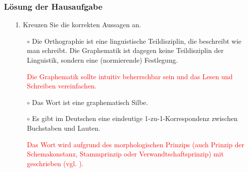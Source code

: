 
\begin{frame}%
\frametitle{Lösung der Hausaufgabe}

\begin{itemize}
	
	\item[1.] Kreuzen Sie die korrekten Aussagen an.
	
	\begin{itemize}
		\item[$\circ$] Die Orthographie ist eine linguistische Teildisziplin, die beschreibt wie man schreibt. Die Graphematik ist dagegen keine Teildisziplin der Linguistik, sondern eine  (normierende) Festlegung.
		
		\item[\alertred{$\checkmark$}] \textcolor{red}{Die Graphematik sollte intuitiv beherrschbar sein und das Lesen und Schreiben vereinfachen.}
		
		\item[$\circ$] Das Wort  ist eine graphematisch  Silbe.
		
		\item[$\circ$] Es gibt im Deutschen eine eindeutige 1-zu-1-Korrespondenz zwischen Buchstaben und Lauten.
		
		\item[\alertred{$\checkmark$}] \textcolor{red}{Das Wort  wird aufgrund des morphologischen Prinzips (auch Prinzip der Schemakonstanz, Stammprinzip oder Verwandtschaftsprinzip) mit  geschrieben (vgl. ).}
	\end{itemize}
\end{itemize}
\end{frame}


